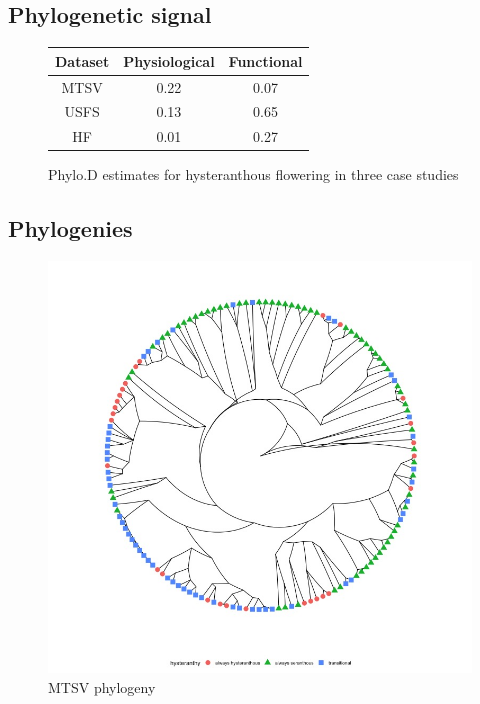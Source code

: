 \documentclass[12pt]{article}\usepackage[]{graphicx}\usepackage[]{color}
\begin{document}
\subsection*{Phylogenetic signal}
\begin{figure}[h!]
\begin{tabular}[width=\textwidth]{|c|c|c|}
\hline
Dataset&Physiological&Functional\\
\hline
MTSV&0.22&0.07\\
USFS&0.13&0.65\\
HF&0.01&0.27\\
\hline
\end{tabular}
\caption{Phylo.D estimates for hysteranthous flowering in three case studies}
\label{fig:Figure 7}
\end{figure}

\subsection*{Phylogenies}
 \begin{figure}
    \centering
    \includegraphics[height=.4\textheight]{..//figure/michtreeplot.jpeg}
    \caption{MTSV phylogeny}
    \label{fig:Figure 8}
    \end{figure}
    
\end{document}
